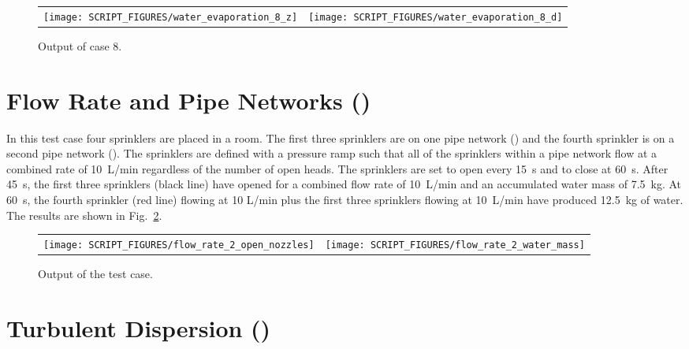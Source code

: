 \documentclass[11pt]{book}
\begin{document}
\begin{figure}[h!]
\noindent
\begin{tabular*}{\textwidth}{l@{\extracolsep{\fill}}r}
\texttt{[image: SCRIPT\_FIGURES/water\_evaporation\_8\_z]} &
\texttt{[image: SCRIPT\_FIGURES/water\_evaporation\_8\_d]}
\end{tabular*}
\caption[Sample case ]{Output of  case 8.}
\label{water_evaporation_8_plots}
\end{figure}


\section{Flow Rate and Pipe Networks (\texorpdfstring{{}}{flow\_rate\_2}) }
\label{flow_rate_2}

In this test case four sprinklers are placed in a room.  The first three sprinklers are on one pipe network () and the fourth sprinkler is on a second pipe network ().  The sprinklers are defined with a pressure ramp such that all of the sprinklers within a pipe network flow at a combined rate of 10~L/min regardless of the number of open heads.  The sprinklers are set to open every 15~s and to close at 60~s.  After 45~s, the first three sprinklers (black line) have opened for a combined flow rate of 10~L/min and an accumulated water mass of 7.5~kg.  At 60~s, the fourth sprinkler (red line) flowing at 10 L/min plus the first three sprinklers flowing at 10~L/min have produced 12.5~kg of water. The results are shown in Fig.~\ref{flow_rate_2_figure}.

\begin{figure}[ht]
\begin{tabular*}{\textwidth}{lr}
\texttt{[image: SCRIPT\_FIGURES/flow\_rate\_2\_open\_nozzles]} &
\texttt{[image: SCRIPT\_FIGURES/flow\_rate\_2\_water\_mass]}
\end{tabular*}
\caption[The  case]{Output of the  test case.}
\label{flow_rate_2_figure}
\end{figure}



\section{Turbulent Dispersion (\texorpdfstring{{}}{random\_walk}) }
\label{turbulent_dispersion}
\label{random_walk}
\end{document}
